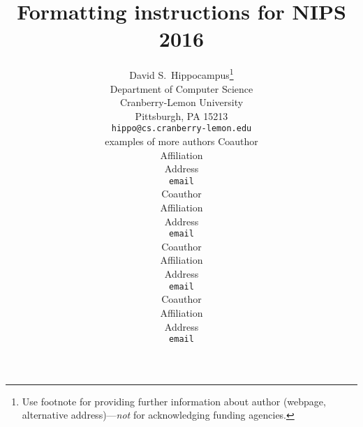 
\usepackage[printwatermark=true]{xwatermark}


\title{Formatting instructions for NIPS 2016}

%

\author{
  David S.~Hippocampus\thanks{Use footnote for providing further
    information about author (webpage, alternative
    address)---\emph{not} for acknowledging funding agencies.} \\
  Department of Computer Science\\
  Cranberry-Lemon University\\
  Pittsburgh, PA 15213 \\
  \texttt{hippo@cs.cranberry-lemon.edu} \\
  examples of more authors
  \And
  Coauthor \\
  Affiliation \\
  Address \\
  \texttt{email} \\
  \AND
  Coauthor \\
  Affiliation \\
  Address \\
  \texttt{email} \\
  \And
  Coauthor \\
  Affiliation \\
  Address \\
  \texttt{email} \\
  \And
  Coauthor \\
  Affiliation \\
  Address \\
  \texttt{email} \\
}
